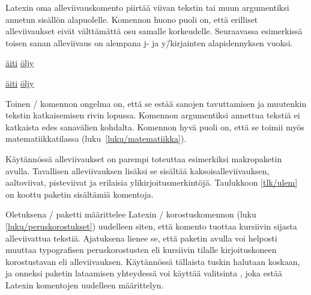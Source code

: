 Latexin oma alleviivauskomento  piirtää viivan
tekstin tai muun argumentiksi annetun sisällön alapuolelle. Komennon
huono puoli on, että erilliset alleviivaukset eivät välttämättä osu
samalle korkeudelle. Seuraavassa esimerkissä toisen sanan alleviivaus on
alempana j- ja y\=/kirjainten alapidennyksen vuoksi.

\begin{koodilohkosis}
\underline{äiti} \underline{öljy}
\end{koodilohkosis}

\begin{tulossis}
  \underline{äiti} \underline{öljy}
\end{tulossis}

Toinen \-/ komennon ongelma on, että se estää sanojen
tavuttamisen ja muutenkin tekstin katkaisemisen rivin lopussa. Komennon
argumentiksi annettua tekstiä ei katkaista edes sanavälien kohdalta.
Komennon hyvä puoli on, että se toimii myös matematiikkatilassa
(luku~\ref{luku/matematiikka}).

Käytännössä alleviivaukset on parempi toteuttaa esimerkiksi makropaketin
 avulla. Tavallisen alleviivauksen lisäksi
se sisältää kaksoisalleviivauksen, aaltoviivat, pisteviivat ja erilaisia
ylikirjoitusmerkintöjä. Taulukkoon \ref{tlk/ulem} on koottu paketin
sisältämiä komentoja.


Oletuksena \-/ paketti määrittelee Latexin
\-/ korostuskomennon (luku \ref{luku/peruskorostukset})
uudelleen siten, että komento tuottaa kursiivin sijasta alleviivattua
tekstiä. Ajatuksena lienee se, että paketin avulla voi helposti muuttaa
typografisen peruskorostusten eli kursiivin tilalle kirjoituskoneen
korostustavan eli alleviivauksen. Käytännössä tällaista tuskin halutaan
koskaan, ja onneksi paketin lataamisen yhteydessä voi käyttää valitsinta
, joka estää Latexin komentojen uudelleen
määrittelyn.

